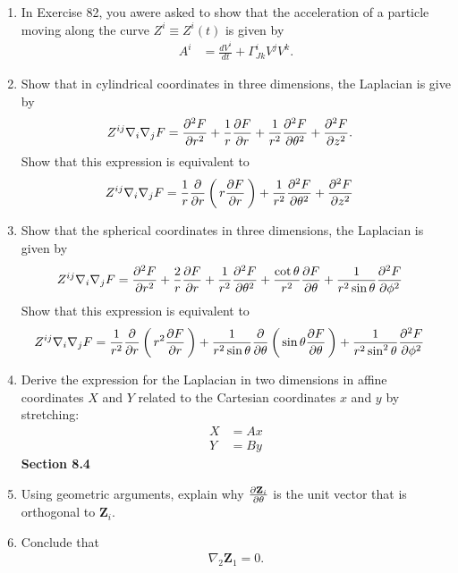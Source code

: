 \documentclass[12pt,a4paper]{report}
\newcommand{\COFF}[3]{\Gamma^{#1}_{{#2}{#3}}}
\newcommand{\VK}[1]{\textbf{#1}}
\begin{document}
\begin{enumerate}[label=\textbf{\arabic*.}]
\textbf{Section 8.3}
\item In Exercise 82, you awere asked to show that the acceleration of a particle moving along the curve $Z^i\equiv Z^i(t)$ is given by 
\begin{align*}
	A^i&=\frac{dV^i}{dt}+\COFF{i}{J}{k}V^jV^k.
\end{align*}

\item Show that in cylindrical coordinates in three dimensions, the Laplacian is give by 
\begin{align*}
	Z^{ij}\nabla_i\nabla_j F &= \frac{\partial^2 F}{\partial r^2} + \frac{1}{r}\frac{\partial F}{\partial r} + \frac{1}{r^2}\frac{\partial^2 F}{\partial \theta^2} + \frac{\partial^2 F}{\partial z^2}.
\end{align*}Show that this expression is equivalent to 
\begin{align*}
	Z^{ij}\nabla_i\nabla_j F &= \frac{1}{r}\frac{\partial }{\partial r}\left (\, r\frac{\partial F}{\partial r} \,\right )+\frac{1}{r^2}\frac{\partial^2 F}{\partial\theta^2}+\frac{\partial^2 F}{\partial z^2}
\end{align*}

\item Show that the spherical coordinates in three dimensions, the Laplacian is given by
\begin{align*}
	Z^{ij}\nabla_i\nabla_j F &= \frac{\partial^2 F}{\partial r^2} + \frac{2}{r}\frac{\partial F}{\partial r}+\frac{1}{r^2}\frac{\partial^2 F}{\partial \theta^2}+\frac{\cot \theta}{r^2}\frac{\partial F}{\partial \theta}+\frac{1}{r^2\sin\theta}\frac{\partial^2 F}{\partial \phi^2}
\end{align*}Show that this expression is equivalent to 
\begin{align*}
	Z^{ij}\nabla_i\nabla_j F &= \frac{1}{r^2}\frac{\partial }{\partial r}\left (\, r^2\frac{\partial F}{\partial r} \,\right )+\frac{1}{r^2\sin\theta}\frac{\partial }{\partial \theta}\left (\, \sin\theta\frac{\partial F}{\partial \theta} \,\right )+\frac{1}{r^2\sin^2\theta}\frac{\partial^2 F}{\partial \phi^2}
\end{align*}

\item Derive the expression for the Laplacian in two dimensions in affine coordinates $X$ and $Y$ related to the Cartesian coordinates $x$ and $y$ by stretching:
\begin{align*}
	X &= Ax\\
	Y &= By
\end{align*}
\textbf{Section 8.4}
\item Using geometric arguments, explain why $\PART{\VK{Z}_i}{\theta}$ is the unit vector that is orthogonal to $\VK{Z}_i$.

\item Conclude that 
\begin{align*}
	\nabla_2\VK{Z}_1=0.
\end{align*}


\end{enumerate}
\end{document}
